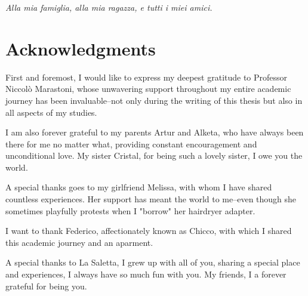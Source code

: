 
\begin{titlepage}
    \pagestyle{empty}
    \makefrontpage
    \restoregeometry
\end{titlepage}

\newpage
\thispagestyle{empty}
\mbox{}  %
\newpage


\frontmatter
\null{}
\begin{flushright}
    \textit{Alla mia famiglia, alla mia ragazza, e tutti i miei amici.}

\end{flushright}
\null

\chapter*{Acknowledgments}
First and foremost, I would like to express my deepest gratitude to Professor Niccolò Marastoni, whose unwavering support throughout my entire academic journey has been invaluable--not only during the writing of this thesis but also in all aspects of my studies.

I am also forever grateful to my parents Artur and Alketa, who have always been there for me no matter what, providing constant encouragement and unconditional love. My sister Cristal, for being such a lovely sister, I owe you the world.

A special thanks goes to my girlfriend Melissa, with whom I have shared countless experiences. Her support has meant the world to me--even though she sometimes playfully protests when I "borrow" her hairdryer adapter.

I want to thank Federico, affectionately known as Chicco, with which I shared this academic journey and an aparment.

A special thanks to La Saletta, I grew up with all of you, sharing a special place and experiences, I always have so much fun with you. My friends, I a forever grateful for being you. 

